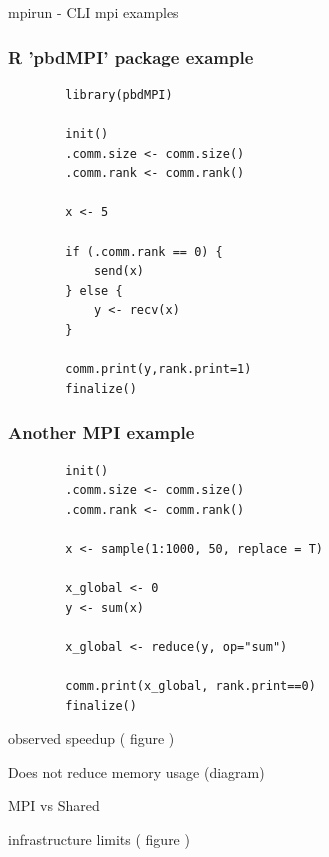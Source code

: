 \begin{frame}
		mpirun - CLI mpi examples
\end{frame}

\begin{frame}[fragile]
		\frametitle{R 'pbdMPI' package example}
		\begin{verbatim}
		library(pbdMPI)

		init()
		.comm.size <- comm.size()
		.comm.rank <- comm.rank()

		x <- 5

		if (.comm.rank == 0) {
		    send(x)
		} else {
		    y <- recv(x)
		}

		comm.print(y,rank.print=1)
		finalize()
		\end{verbatim}
\end{frame}

\begin{frame}[fragile]
		\frametitle{Another MPI example}
		\begin{verbatim}
		init()
		.comm.size <- comm.size()
		.comm.rank <- comm.rank()

		x <- sample(1:1000, 50, replace = T)

		x_global <- 0
		y <- sum(x)

		x_global <- reduce(y, op="sum")

		comm.print(x_global, rank.print==0)
		finalize()
		\end{verbatim}
\end{frame}

\begin{frame}
		observed speedup ( figure )
\end{frame}

\begin{frame}
		Does not reduce memory usage (diagram)
\end{frame}

\begin{frame}
		MPI vs Shared
\end{frame}

\begin{frame}
		infrastructure limits ( figure )
\end{frame}


